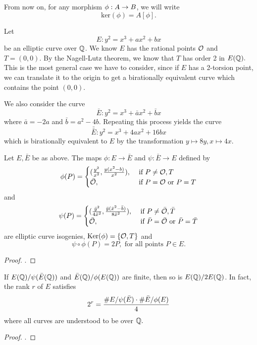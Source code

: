 \documentclass[12pt, a4paper]{report}
\begin{document}
\begin{remark}
  From now on, for any morphism $\phi : A \rightarrow B$, we
  will write $$\text{ker}(\phi) = A[\phi].$$
\end{remark}

Let $$E : y^2 = x^3 + ax^2 + bx$$ be an elliptic curve over ${\mathbb Q}$. We know $E$
has the rational points ${\mathcal O}$ and $ T = (0,0)$. By the Nagell-Lutz theorem, we
know that $T$ has order 2 in $E({\mathbb Q}).$ This is the most general case we have to
consider, since if $E$ has a 2-torsion point, we can translate it to the origin
to get a birationally equivalent curve which contains the point $(0,0).$

We also consider the curve
\[ \bar{E} : y^2 = x^3 + \bar{a}x^2 + \bar{b}x \]
where $\bar{a} = -2a$ and $\bar{b} = a^2 - 4b$. Repeating this process yields
the curve
\[ \bar{\bar{E}} : y^2 = x^3 +  4ax^2 + 16bx\]
which is birationally equivalent to $E$ by the transformation $y \mapsto 8y,
x \mapsto 4x$.

\begin{prop}
  Let $E, \bar{E}$ be as above. The maps $\phi : E \rightarrow \bar{E}$ and
  $\psi : \bar{E} \rightarrow E$ defined by
  \[\phi(P) =
    \begin{cases}
      (\frac{y^2}{x^2}, \frac{y(x^2-b)}{x^2}), & \text{ if } P \neq {\mathcal O}, T \\
      \bar{{\mathcal O}}, & \text{ if } P = {\mathcal O} \text{ or } P = T
    \end{cases}\]
  and
  \[\psi(P) =
    \begin{cases}
      (\frac{\bar{y}^2}{4\bar{x}^2}, \frac{\bar{y}(\bar{x}^2-\bar{b})}{8\bar{x}^2}),
      & \text{ if } P \neq \bar{{\mathcal O}}, \bar{T} \\
      \bar{{\mathcal O}}, & \text{ if } \bar{P} = \bar{{\mathcal O}} \text{ or } \bar{P} = \bar{T}
    \end{cases}\]
  are elliptic curve isogenies, $\text{Ker}(\phi) = \{{\mathcal O}, T\}$ and
  \[ \psi \circ \phi (P) = 2P , \text{ for all points } P \in E.\]
\end{prop}
\begin{proof}
  \cite[See][Chapter 4, page 79]{rational}.
\end{proof}

\begin{lemma} \label{lemma:rankformula}
  If $E({\mathbb Q}) / \psi(\bar{E}({\mathbb Q}))$ and $\bar{E}({\mathbb Q}) / \phi(E({\mathbb Q}))$ 
  are finite, then so is $E({\mathbb Q})/2E({\mathbb Q})$.
  In fact, the rank $r$ of $E$ satisfies
  \[2^r = \frac{\#E/\psi(\bar{E}) \cdot \#\bar{E}/\phi(E)}{4}\]
  where all curves are understood to be over ${\mathbb Q}.$
\end{lemma}
\begin{proof}
  \cite[See][Chapter 4, page 83]{rational}.
\end{proof}
\end{document}
